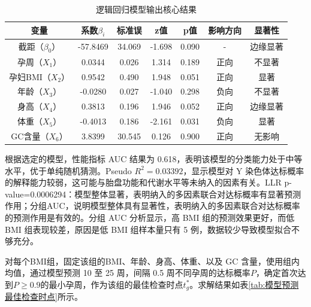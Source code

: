 \documentclass[withoutpreface,bwprint]{cumcmthesis} %
\begin{document}
\begin{table}[H]
    \centering  %
    \caption{逻辑回归模型输出核心结果}  %
    \label{tab:模型拟合输出核心结果}  %
    \begin{threeparttable}
        \begin{tabularx}{0.9\textwidth}{c c c c c c c}
            \toprule[1.5pt]
            \textbf{变量} & \textbf{系数$\beta_i$} & \textbf{标准误} & \textbf{z值}& \textbf{p值}& \textbf{影响方向}& \textbf{显著性}\\ 
            \midrule[1pt]
            截距（$\beta_0$）&  -57.8469& 34.069  & -1.698 & 0.090  & -     & 边缘显著\\  
            孕周（$X_1$）    & 0.0344  & 0.026   & 1.314  & 0.189  & 正向    & 不显著   \\ 
            孕妇BMI（$X_2$） &  0.9542  & 0.490   & 1.948  & 0.051  & 正向    & 显著    \\  
            年龄（$X_3$）    & -0.0280 & 0.027   & -1.040 & 0.298  & 负向    & 不显著   \\ 
            身高（$X_4$）    & 0.3813  & 0.196   & 1.946  & 0.052  & 正向    & 边缘显著 \\ 
            体重（$X_5$）    & -0.4013 & 0.186   & -2.161 & 0.031  & 负向    & 显著     \\ 
            GC含量（$X_6$）  & 3.8399  & 30.545  & 0.126  & 0.900  & 正向    & 无影响   \\ 
            \bottomrule[1.5pt]
        \end{tabularx}
    \end{threeparttable}
\end{table}
根据选定的模型，性能指标 AUC 结果为 0.618，表明该模型的分类能力处于中等水平，优于单纯随机猜测。Pseudo $R^2=0.03392$，显示模型对 Y 染色体达标概率的解释能力较弱，这可能与胎盘功能和代谢水平等未纳入的因素有关。LLR p-value=0.0006294：模型整体显著，表明纳入的多因素联合对达标概率有显著预测作用；分组AUC，说明模型整体具有显著性，表明纳入的多因素联合对达标概率的预测作用是有效的。分组 AUC 分析显示，高 BMI 组的预测效果更好，而低 BMI 组表现较差，原因是低 BMI 组样本量只有 5 例，数据较少导致模型拟合不够充分。  

对每个BMI组，固定该组的BMI、年龄、身高、体重、以及 GC 含量，使用组内均值，通过模型预测 10 至 25 周，间隔 0.5 周不同孕周的达标概率$P$，确定首次达到$P≥0.9$的最小孕周，作为该组的最佳检查时点$t_g^*$。求解结果如表\ref{tab:模型预测最佳检查时点}所示。
\end{document}

